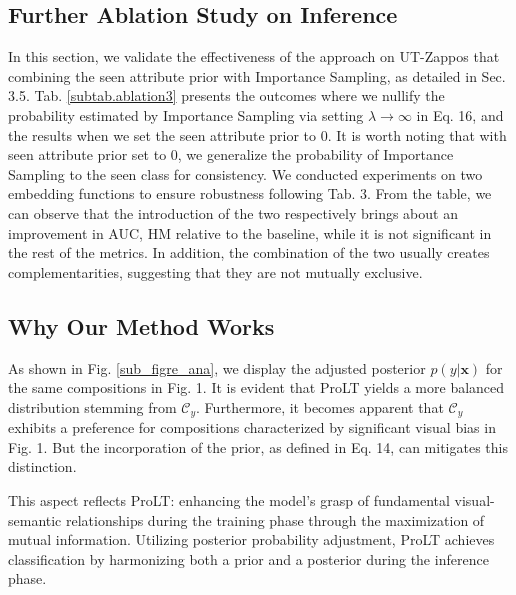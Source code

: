 \documentclass[letterpaper]{article} %
\newcommand{\mx}{\mathbf{x}}
\theoremstyle{definition}
\begin{document}
\subsection{Further Ablation Study on Inference}
In this section, we validate the effectiveness of the approach on UT-Zappos that combining the seen attribute prior with Importance Sampling, as detailed in Sec. 3.5. Tab. \ref{subtab.ablation3} presents the outcomes where we nullify the probability estimated by Importance Sampling via setting $\lambda \rightarrow \infty $ in Eq. 16, and the results when we set the seen attribute prior to $0$. It is worth noting that with seen attribute prior set to 0, we generalize the probability of Importance Sampling to the seen class for consistency. We conducted experiments on two embedding functions to ensure robustness following Tab. 3. From the table, we can observe that the introduction of the two respectively brings about an improvement in AUC, HM relative to the baseline, while it is not significant in the rest of the metrics. In addition, the combination of the two usually creates complementarities, suggesting that they are not mutually exclusive.


\subsection{Why Our Method Works}
As shown in Fig. \ref{sub_figre_ana}, we display the adjusted posterior $p(y|\mx)$ for the same compositions in Fig. 1. It is evident that ProLT yields a more balanced distribution stemming from $\mathcal{C}_{y}$. Furthermore, it becomes apparent that $\mathcal{C}_y$ exhibits a preference for compositions characterized by significant visual bias in Fig. 1. But the incorporation of the prior, as defined in Eq. 14, can mitigates this distinction.

This aspect reflects ProLT: enhancing the model's grasp of fundamental visual-semantic relationships during the training phase through the maximization of mutual information. Utilizing posterior probability adjustment, ProLT achieves classification by harmonizing both a prior and a posterior during the inference phase.
\end{document}
